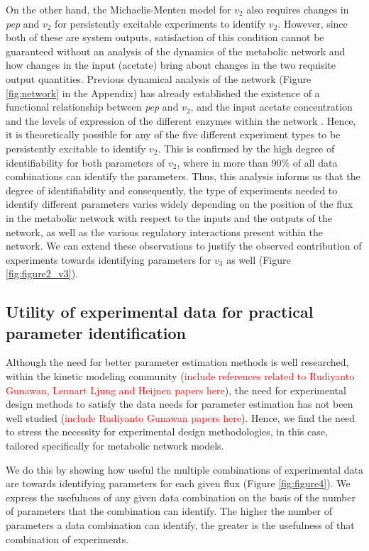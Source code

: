 \documentclass[10pt]{article}
\begin{document}
	On the other hand, the Michaelis-Menten model for $v_2$ also requires changes in \textit{pep} and $v_2$ for persistently excitable experiments to identify $v_2$. However, since both of these are system outputs, satisfaction of this condition cannot be guaranteed without an analysis of the dynamics of the metabolic network and how changes in the input (acetate) bring about changes in the two requisite output quantities. Previous dynamical analysis of the network (Figure \ref{fig:network} in the Appendix) has already established the existence of a functional relationship between \textit{pep} and $v_2$, and the input acetate concentration and the levels of expression of the different enzymes within the network \parencite{Srinivasan2017}. Hence, it is theoretically possible for any of the five different experiment types to be persistently excitable to identify $v_2$. This is confirmed by the high degree of identifiability for both parameters of $v_2$, where in more than 90\% of all data combinations can identify the parameters. Thus, this analysis informs us that the degree of identifiability and consequently, the type of experiments needed to identify different parameters varies widely depending on the position of the flux in the metabolic network with respect to the inputs and the outputs of the network, as well as the various regulatory interactions present within the network. We can extend these observations to justify the observed contribution of experiments towards identifying parameters for $v_3$ as well (Figure \ref{fig:figure2_v3}).		
		
	\subsection{Utility of experimental data for practical parameter identification}\label{sec:data_utility}
	Although the need for better parameter estimation methods is well researched, within the kinetic modeling community (\textcolor{red}{include references related to Rudiyanto Gunawan, Lennart Ljung and Heijnen papers here}), the need for experimental design methods to satisfy the data needs for parameter estimation has not been well studied (\textcolor{red}{include Rudiyanto Gunawan papers here}). Hence, we find the need to stress the necessity for experimental design methodologies, in this case, tailored specifically for metabolic network models. 	
	
	We do this by showing how useful the multiple combinations of experimental data are towards identifying parameters for each given flux (Figure \ref{fig:figure4}). We express the usefulness of any given data combination on the basis of the number of parameters that the combination can identify. The higher the number of parameters a data combination can identify, the greater is the usefulness of that combination of experiments. 
	
\end{document}
